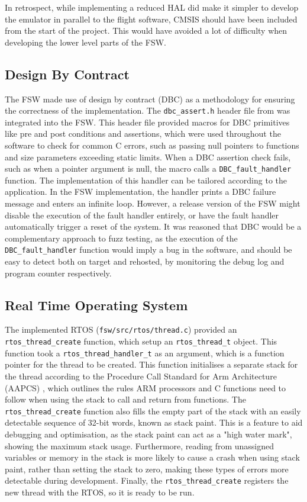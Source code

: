 \documentclass[../report.tex]{subfiles}
\begin{document}
In retrospect, while implementing a reduced HAL did make it simpler to develop
the emulator in parallel to the flight software, CMSIS should have been
included from the start of the project. This would have avoided a lot of
difficulty when developing the lower level parts of the FSW.

\subsection{Design By Contract}

The FSW made use of design by contract (DBC) as a methodology for ensuring the
correctness of the implementation. The \lstinline|dbc_assert.h| header file
from \citet{dbc_assert} was integrated into the FSW. This header file provided
macros for DBC primitives like pre and post conditions and assertions, which
were used throughout the software to check for common C errors, such as passing
null pointers to functions and size parameters exceeding static limits. When a
DBC assertion check fails, such as when a pointer argument is null, the macro
calls a \lstinline|DBC_fault_handler| function. The implementation of this
handler can be tailored according to the application. In the FSW
implementation, the handler prints a DBC failure message and enters an infinite
loop. However, a release version of the FSW might disable the execution of the
fault handler entirely, or have the fault handler automatically trigger a reset
of the system. It was reasoned that DBC would be a complementary approach to
fuzz testing, as the execution of the \lstinline|DBC_fault_handler| function
would imply a bug in the software, and should be easy to detect both on target
and rehosted, by monitoring the debug log and program counter respectively.

\subsection{Real Time Operating System} \label{sec:fsw-rtos}

The implemented RTOS (\lstinline|fsw/src/rtos/thread.c|) provided an
\lstinline|rtos_thread_create| function, which setup an
\lstinline|rtos_thread_t| object. This function took a
\lstinline|rtos_thread_handler_t| as an argument, which is a function pointer
for the thread to be created. This function initialises a separate stack for
the thread according to the Procedure Call Standard for Arm Architecture
(AAPCS) \citep{AAPCS}, which outlines the rules ARM processors and C functions
need to follow when using the stack to call and return from functions. The
\lstinline|rtos_thread_create| function also fills the empty part of the stack
with an easily detectable sequence of 32-bit words, known as stack paint. This
is a feature to aid debugging and optimisation, as the stack paint can act as a
"high water mark", showing the maximum stack usage. Furthermore, reading from
unassigned variables or memory in the stack is more likely to cause a crash
when using stack paint, rather than setting the stack to zero, making these
types of errors more detectable during development. Finally, the
\lstinline|rtos_thread_create| registers the new thread with the RTOS, so it is
ready to be run.
\end{document}
